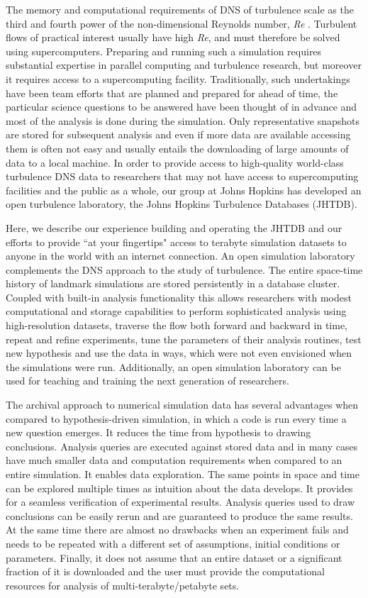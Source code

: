 \documentclass[10pt,twocolumn]{article}
\begin{document}
The memory and computational requirements of DNS of turbulence scale as the third and fourth power of the
non-dimensional Reynolds number, \emph{Re} \cite{Lee}. Turbulent flows of practical interest usually have high
\emph{Re}, and must therefore be solved using supercomputers. Preparing and running such a simulation requires substantial expertise in parallel
computing and turbulence research, but moreover it requires access to a supercomputing facility. Traditionally, such undertakings have been team 
efforts that are planned and prepared for ahead of time, the particular science questions to be answered have been thought of in advance and most of the
analysis is done during the simulation. Only representative snapshots are stored for subsequent analysis and even if more data are available accessing
them is often not easy and usually entails the downloading of large amounts of data to a local machine. In order to provide access to high-quality
world-class turbulence DNS data to researchers that may not have access to supercomputing facilities and the public as a whole, our group at Johns 
Hopkins has developed an open turbulence laboratory, the Johns Hopkins Turbulence Databases (JHTDB). 

Here, we describe our experience building and operating the JHTDB and our efforts to provide ``at your fingertips" access to terabyte simulation datasets
to anyone in the world with an internet connection. An open simulation laboratory complements the DNS approach to the study of turbulence. The entire
space-time history of landmark simulations are stored persistently in a database cluster. Coupled with built-in analysis functionality this allows researchers
with modest computational and storage capabilities to perform sophisticated analysis using high-resolution datasets, traverse the flow both forward and
backward in time, repeat and refine experiments, tune the parameters of their analysis routines, test new hypothesis and use the data in ways, which were 
not even envisioned when the simulations were run. Additionally, an open simulation laboratory can be used for teaching and training the next generation 
of researchers.

{\color{red}The archival approach to numerical simulation data has several advantages when compared to hypothesis-driven simulation, in which a code is 
run every time a new question emerges. It reduces the time from hypothesis to drawing conclusions. Analysis queries are executed against stored data and 
in many cases have much smaller data and computation requirements when compared to an entire simulation. It enables data exploration. The same points 
in space and time can be explored multiple times as intuition about the data develops. It provides for a seamless verification of experimental results. Analysis
queries used to draw conclusions can be easily rerun and are guaranteed to produce the same results. At the same time there are almost no drawbacks 
when an experiment fails and needs to be repeated with a different set of assumptions, initial conditions or parameters. Finally, it does not assume that an
entire dataset or a significant fraction of it is downloaded and the user must provide the computational resources for analysis of multi-terabyte/petabyte sets.}
\end{document}
